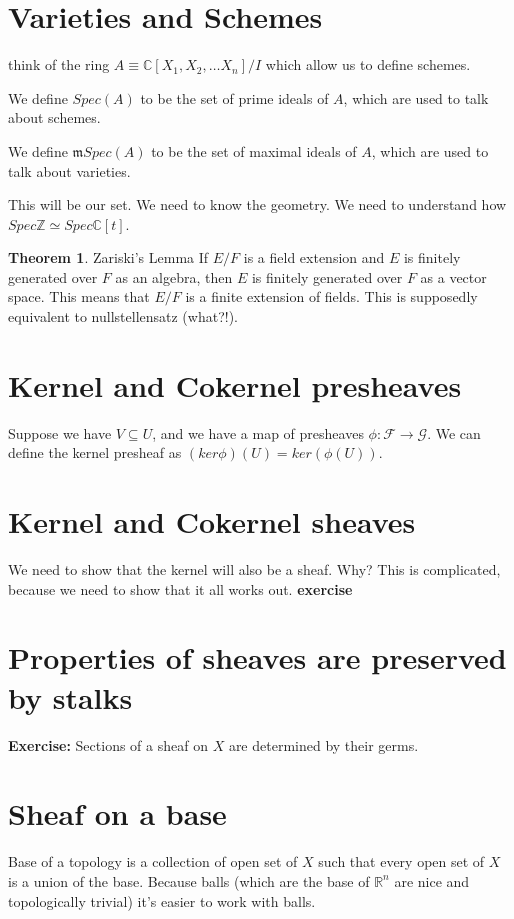 \documentclass{book}
\newcommand{\F}{\ensuremath{\mathcal{F}}}
\newcommand{\G}{\ensuremath{\mathcal{G}}}
\newcommand{\Z}{\ensuremath{\mathbb{Z}}}
\newcommand{\C}{\ensuremath{\mathbb{C}}}
\newcommand{\Spec}{\ensuremath{Spec}}
\newcommand{\m}{\mathfrak{m}}
\theoremstyle{definition}
\newtheorem{theorem}{Theorem}
\begin{document}
\section{Varieties and Schemes}
think of the ring $A \equiv \C[X_1, X_2, \dots X_n] / I$ which allow us to
define schemes. 

We define $\Spec(A)$ to be the set of prime ideals of $A$, which
are used to talk about schemes. 

We define $\m\Spec(A)$ to be the set of maximal
ideals of $A$, which are used to talk about varieties.

This will be our set. We need to know the geometry. We need to understand
how $\Spec \Z \simeq \Spec \C[t]$.


\begin{theorem}
    Zariski's Lemma If $E/F$ is a field extension and $E$ is finitely generated
    over $F$ as an algebra, then $E$ is finitely generated over $F$ as a vector space.
    This means that $E/F$ is a finite extension of fields.
    This is supposedly equivalent to nullstellensatz (what?!).
\end{theorem}

\section{Kernel and Cokernel presheaves}
Suppose we have $V \subseteq U$, and we have a map of presheaves $\phi: \F \rightarrow \G$.
We can define the kernel presheaf as $(ker \phi)(U) = ker(\phi(U))$.

\section{Kernel and Cokernel sheaves}
We need to show that the kernel will also be a sheaf. Why? This is complicated,
because we need to show that it all works out. \textbf{exercise}

\section{Properties of sheaves are preserved by stalks}
\textbf{Exercise:} Sections of a sheaf on $X$ are determined by their germs.

\section{Sheaf on a base}
Base of a topology is a collection of open set of $X$ such that every open set
of $X$  is a union of the base. Because balls (which are the base of $\mathbb R^n$
are nice and topologically trivial) it's easier to work with balls.
\end{document}
